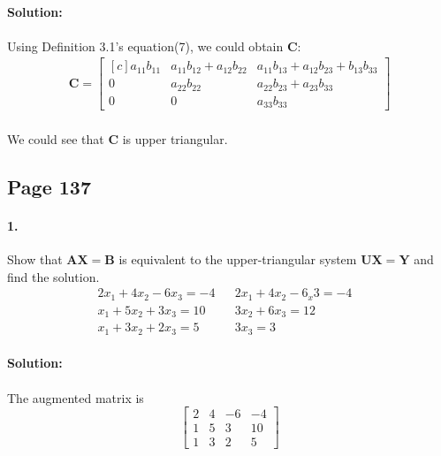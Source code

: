 \documentclass{article}  %
\begin{document}
        \paragraph{Solution:}
        \paragraph{}Using Definition 3.1's equation(7), we could obtain $\bm{C}$:
        \begin{align*}
            \bm{C=}  \begin{bmatrix*}[c]
            a_{11}b_{11} & a_{11}b_{12} + a_{12}b_{22} & a_{11}b_{13} + a_{12}b_{23} + b_{13}b_{33} \\
            0 & a_{22}b_{22} & a_{22}b_{23} + a_{23}b_{33} \\
            0 & 0 & a_{33}b_{33}
            \end{bmatrix*}
        \end{align*}
        \paragraph{}We could see that $\bm{C}$ is upper triangular.
        \subsection*{Page 137}
        \paragraph{1.}Show that $\bm{AX = B}$ is equivalent to the upper-triangular system $\bm{UX = Y}$ and find the solution.
        \begin{align*}
            2x_1 + 4x_2 - 6x_3 = -4& & 2x_1 + 4x_2 - 6_x3 = -4&\\
            x_1 + 5x_2 + 3x_3 = 10& & 3x_2 + 6x_3 = 12&\\
            x_1 + 3x_2 + 2x_3 = 5& & 3x_3 = 3&
        \end{align*}
        \paragraph{Solution:}
        \paragraph{}The augmented matrix is 
        \begin{equation*}       %
            \left[                 %
              \begin{array}{rrr|r}   %
                2 & 4 & -6 & -4 \\  %
                1 & 5 & 3 & 10 \\  %
                1 & 3 & 2 & 5
              \end{array}
            \right]                 %
        \end{equation*}
\end{document}
